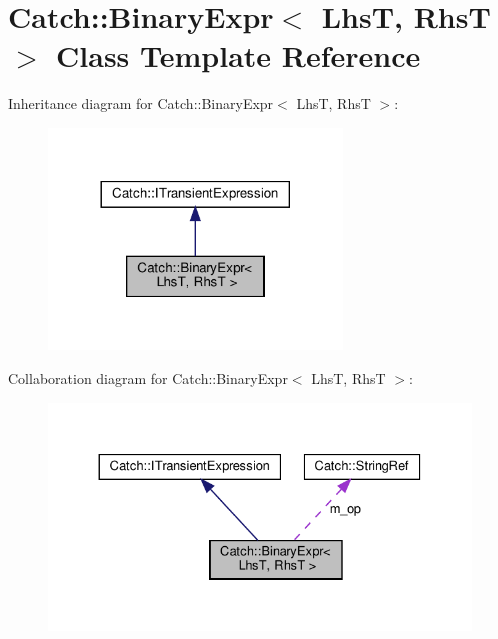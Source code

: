\hypertarget{classCatch_1_1BinaryExpr}{}\section{Catch\+:\+:Binary\+Expr$<$ LhsT, RhsT $>$ Class Template Reference}
\label{classCatch_1_1BinaryExpr}


Inheritance diagram for Catch\+:\+:Binary\+Expr$<$ LhsT, RhsT $>$\+:
\nopagebreak
\begin{figure}[H]
\begin{center}
\leavevmode
\includegraphics[width=221pt]{classCatch_1_1BinaryExpr__inherit__graph}
\end{center}
\end{figure}


Collaboration diagram for Catch\+:\+:Binary\+Expr$<$ LhsT, RhsT $>$\+:
\nopagebreak
\begin{figure}[H]
\begin{center}
\leavevmode
\includegraphics[width=330pt]{classCatch_1_1BinaryExpr__coll__graph}
\end{center}
\end{figure}
